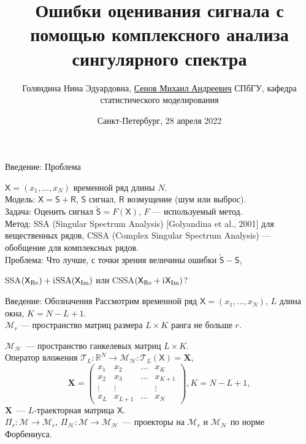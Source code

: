 \documentclass[ucs, notheorems, handout]{beamer}
\title[Ошибки CSSA]
{Ошибки оценивания сигнала с помощью комплексного анализа сингулярного спектра}
\subtitle
{}
\author[Голяндина Н.Э., Сенов М.А.]
{Голяндина Нина Эдуардовна, \underline{Сенов Михаил Андреевич}
СПбГУ, кафедра статистического моделирования}
\institute[СПИСОК]{
Конференция СПИСОК-2022\\
Секция <<Вычислительная стохастика и статистические модели>>}
\date[Зачет]{Санкт-Петербург, 28 апреля 2022}
\newcommand{\tX}[1]{\mathsf{#1}}
\newcommand{\iu}{\mathrm{i}\mkern1mu}
\begin{document}
\begin{frame}
  \titlepage
  \note{}
\end{frame}

\begin{frame}{Введение: Проблема}

$\tX{X} = (x_1, \ldots, x_{N})$ временной ряд длины $N$.\\
\vspace{1em}
\alert{Модель:} $\tX{X} = \tX{S} + \tX{R}$, $\tX{S}$ сигнал, $\tX{R}$ возмущение (шум или выброс).\\
\vspace{1em}
\alert{Задача:} Оценить сигнал $\tilde{\tX{S}} = F(\tX{X})$, $F$ --- используемый метод.\\
\vspace{1em}
\alert{Метод:} SSA (Singular Spectrum Analysis) [Golyandina et al., 2001] для вещественных рядов, CSSA (Complex Singular Spectrum Analysis) --- обобщение для комплексных рядов.\\
\vspace{1em}
\alert{Проблема:} Что лучше, с точки зрения величины ошибки $\tilde{\tX{S}} - \tX{S}$,

SSA$(\tX{X}_{\Re}) + \iu \text{SSA}(\tX{X}_{\Im})$ или CSSA$(\tX{X}_{\Re} + \iu \tX{X}_{\Im})$?

\end{frame}

\begin{frame}{Введение: Обозначения}
Рассмотрим временной ряд $\tX{X}=(x_1, \ldots, x_{N})$, $L$ длина окна, $K=N-L+1$.\\
\vspace{1em}
$\mathcal{M}_{r}$ --- пространство матриц размера $L \times K$ ранга не больше $r$.

$\mathcal{M}_{\mathcal{H}}$~--- пространство ганкелевых матриц $L\times K$.\\
\vspace{1em}
Оператор вложения $\mathcal{T}_L:\mathbb{R}^N \rightarrow \mathcal{M}_{\mathcal{H}}: \mathcal{T}_L (\tX{X}) = \mathbf{X} $,\\
$$\mathbf{X} = \begin{pmatrix}
           x_1 & x_2 & \ldots & x_{K}\\
           x_2 & x_3 & \ldots & x_{K+1}\\
           \vdots & \vdots & & \vdots\\
           x_{L} & x_{L+1} & \ldots & x_{N}
         \end{pmatrix}, K = N - L + 1,$$
$\mathbf{X}$~--- $L$-траекторная матрица $\tX{X}$.\\
\vspace{1em}
$\Pi_{r}:\mathcal{M}\rightarrow \mathcal{M}_r$,
$\Pi_{\mathcal{H}}:\mathcal{M} \rightarrow \mathcal{M}_{\mathcal{H}}$~--- проекторы на $\mathcal{M}_{r}$ и $\mathcal{M}_{\mathcal{H}}$ по норме Форбениуса.

    \note{}

\end{frame}
\end{document}

